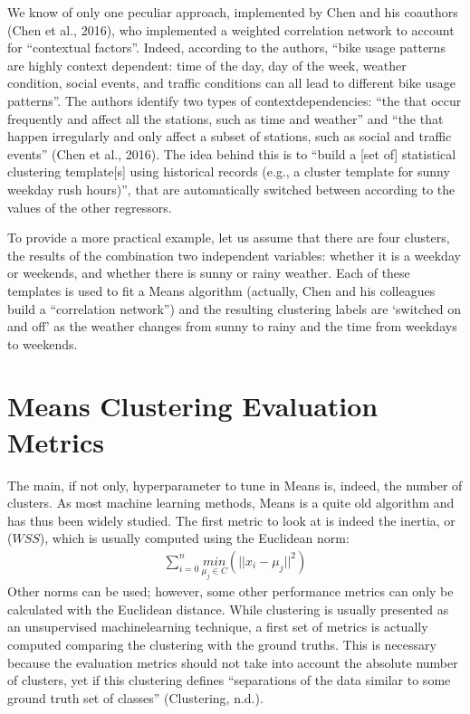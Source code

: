 \documentclass[letterpaper,10pt,english]{jupyterBook}
\begin{document}
\sphinxAtStartPar
We know of only one peculiar approach, implemented by Chen and his coauthors (Chen et al., 2016), who implemented a weighted correlation network to account for “contextual factors”. Indeed, according to the authors, “bike usage patterns are highly context dependent: time of the day, day of the week, weather condition, social events, and traffic conditions can all lead to different bike usage patterns”. The authors identify two types of context\sphinxhyphen{}dependencies: “the  that occur frequently and affect all the stations, such as time and weather” and “the  that happen irregularly and only affect a subset of stations, such as social and traffic events” (Chen et al., 2016). The idea behind this is to “build a {[}set of{]} statistical clustering template{[}s{]} using historical records (e.g., a cluster template for sunny weekday rush hours)”, that are automatically switched between according to the values of the other regressors.

\sphinxAtStartPar
To provide a more practical example, let us assume that there are four clusters, the results of the combination two independent variables: whether it is a weekday or weekends, and whether there is sunny or rainy weather. Each of these templates is used to fit a \sphinxhyphen{}Means algorithm (actually, Chen and his colleagues build a “correlation network”) and the resulting clustering labels are ‘switched on and off’ as the weather changes from sunny to rainy and the time from weekdays to weekends.


\section{\sphinxhyphen{}Means Clustering Evaluation Metrics}
\label{\detokenize{04-stations_kmeans:k-means-clustering-evaluation-metrics}}
\sphinxAtStartPar
The main, if not only, hyperparameter to tune in \sphinxhyphen{}Means is, indeed, the number of clusters.
As most machine learning methods, \sphinxhyphen{}Means is a quite old algorithm and has thus been widely studied.
The first metric to look at is indeed the inertia, or  (\(WSS\)), which is usually computed using the Euclidean norm:
\begin{equation*}
\begin{split}
\sum_{i=0}^{n}\underset{\mu_{j}\in{C}}{min}(||x_{i} - \mu_{j}||^2)
\end{split}
\end{equation*}
\sphinxAtStartPar
Other norms can be used; however, some other performance metrics can only be calculated with the Euclidean distance. While clustering is usually presented as an unsupervised machine\sphinxhyphen{}learning technique, a first set of metrics is actually computed comparing the clustering with the ground truths. This is necessary because the evaluation metrics should not take into account the absolute number of clusters, yet if this clustering defines “separations of the data similar to some ground truth set of classes” (Clustering, n.d.).
\end{document}
